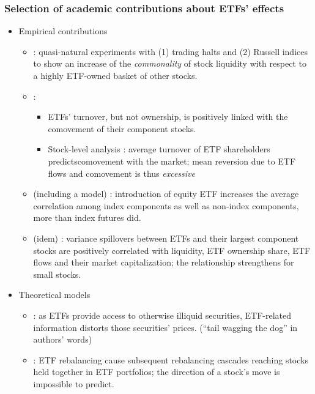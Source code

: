 \documentclass[9pt, usenames, dvipsnames]{beamer}
\begin{document}
\begin{frame}[allowframebreaks]
  \frametitle{Selection of academic contributions about ETFs' effects}
  \begin{itemize}
  \item Empirical contributions
    \begin{itemize}
    \item \textcite{Agarwal2017} : quasi-natural experiments with (1) trading halts and (2) Russell indices to show an increase of the \emph{commonality} of stock liquidity with respect to a highly ETF-owned basket of other stocks.
    \item \textcite{Da2018} :
      \begin{itemize}
      \item ETFs' turnover, but not ownership, is positively linked with the comovement of their component stocks.
      \item Stock-level analysis : average turnover of ETF shareholders predictscomovement with the market; mean reversion due to ETF flows and comovement is thus \emph{excessive}
      \end{itemize}
    \item \textcite{Leippold2015} (including a model) : introduction of equity ETF increases the average correlation among index components as well as non-index components, more than index futures did.
    \item \textcite{Krause2014} (idem) : variance spillovers between ETFs and their largest component stocks are positively correlated with liquidity, ETF ownership share, ETF flows and their market capitalization; the relationship strengthens for small stocks.
    \end{itemize}
  \item Theoretical models
    \begin{itemize}
    \item \textcite{Bhattacharya2016} : as ETFs provide access to otherwise illiquid securities, ETF-related information distorts those securities' prices. (``tail wagging the dog'' in authors' words)
    \item \textcite{Chinco2016} : ETF rebalancing cause subsequent rebalancing cascades reaching stocks held together in ETF portfolios; the direction of a stock's move is impossible to predict.
    \end{itemize}
  \end{itemize}


\end{frame}
\end{document}
